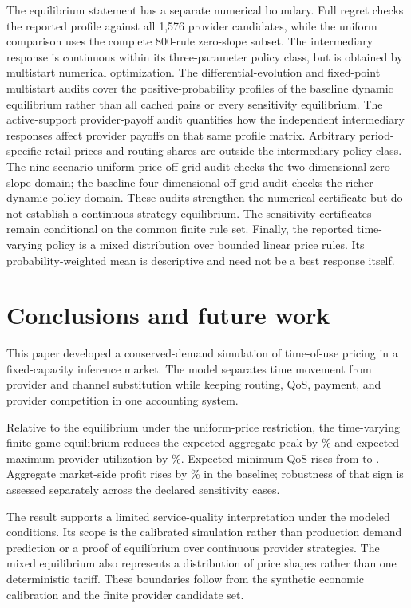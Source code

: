 \documentclass[11pt,a4paper]{article}
\begin{document}
The equilibrium statement has a separate numerical boundary. Full regret checks the reported profile against all 1,576 provider candidates, while the uniform comparison uses the complete 800-rule zero-slope subset. The intermediary response is continuous within its three-parameter policy class, but is obtained by multistart numerical optimization. The differential-evolution and fixed-point multistart audits cover the positive-probability profiles of the baseline dynamic equilibrium rather than all cached pairs or every sensitivity equilibrium. The active-support provider-payoff audit quantifies how the independent intermediary responses affect provider payoffs on that same profile matrix. Arbitrary period-specific retail prices and routing shares are outside the intermediary policy class. The nine-scenario uniform-price off-grid audit checks the two-dimensional zero-slope domain; the baseline four-dimensional off-grid audit checks the richer dynamic-policy domain. These audits strengthen the numerical certificate but do not establish a continuous-strategy equilibrium. The sensitivity certificates remain conditional on the common finite rule set. Finally, the reported time-varying policy is a mixed distribution over bounded linear price rules. Its probability-weighted mean is descriptive and need not be a best response itself.

\section{Conclusions and future work}
\label{sec:conclusion}

This paper developed a conserved-demand simulation of time-of-use pricing in a fixed-capacity inference market. The model separates time movement from provider and channel substitution while keeping routing, QoS, payment, and provider competition in one accounting system.

Relative to the equilibrium under the uniform-price restriction, the time-varying finite-game equilibrium reduces the expected aggregate peak by \AggregatePeakReductionPercent\% and expected maximum provider utilization by \MaximumUtilisationReductionPercent\%. Expected minimum QoS rises from \UniformMinimumQoS{} to \DynamicMinimumQoS{}. Aggregate market-side profit rises by \MarketProfitChangePercent\% in the baseline; robustness of that sign is assessed separately across the declared sensitivity cases.

The result supports a limited service-quality interpretation under the modeled conditions. Its scope is the calibrated simulation rather than production demand prediction or a proof of equilibrium over continuous provider strategies. The mixed equilibrium also represents a distribution of price shapes rather than one deterministic tariff. These boundaries follow from the synthetic economic calibration and the finite provider candidate set.
\end{document}
